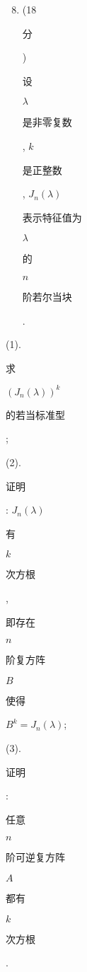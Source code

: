 \documentclass[10pt]{article}
\begin{document}
\begin{enumerate}
  \setcounter{enumi}{7}
  \item (18 \begin{CJK}{UTF8}{mj}分\end{CJK}) \begin{CJK}{UTF8}{mj}设\end{CJK} $\lambda$ \begin{CJK}{UTF8}{mj}是非零复数\end{CJK}, $k$ \begin{CJK}{UTF8}{mj}是正整数\end{CJK}, $J_{n}(\lambda)$ \begin{CJK}{UTF8}{mj}表示特征值为\end{CJK} $\lambda$ \begin{CJK}{UTF8}{mj}的\end{CJK} $n$ \begin{CJK}{UTF8}{mj}阶若尔当块\end{CJK}.
\end{enumerate}
(1). \begin{CJK}{UTF8}{mj}求\end{CJK} $\left(J_{n}(\lambda)\right)^{k}$ \begin{CJK}{UTF8}{mj}的若当标准型\end{CJK};

(2). \begin{CJK}{UTF8}{mj}证明\end{CJK}: $J_{n}(\lambda)$ \begin{CJK}{UTF8}{mj}有\end{CJK} $k$ \begin{CJK}{UTF8}{mj}次方根\end{CJK}, \begin{CJK}{UTF8}{mj}即存在\end{CJK} $n$ \begin{CJK}{UTF8}{mj}阶复方阵\end{CJK} $B$ \begin{CJK}{UTF8}{mj}使得\end{CJK} $B^{k}=J_{n}(\lambda)$;

(3). \begin{CJK}{UTF8}{mj}证明\end{CJK}: \begin{CJK}{UTF8}{mj}任意\end{CJK} $n$ \begin{CJK}{UTF8}{mj}阶可逆复方阵\end{CJK} $A$ \begin{CJK}{UTF8}{mj}都有\end{CJK} $k$ \begin{CJK}{UTF8}{mj}次方根\end{CJK}.
\end{document}

